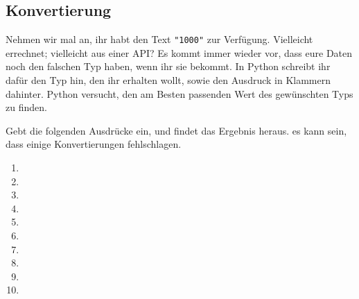 \subsection{Konvertierung}

Nehmen wir mal an, ihr habt den Text \texttt{"1000"} zur Verfügung. Vielleicht
errechnet; vielleicht aus einer API? Es kommt immer wieder vor, dass eure Daten
noch den falschen Typ haben, wenn ihr sie bekommt. In Python schreibt ihr dafür
den Typ hin, den ihr erhalten wollt, sowie den Ausdruck in Klammern dahinter.
Python versucht, den am Besten passenden Wert des gewünschten Typs zu finden.

Gebt die folgenden Ausdrücke ein, und findet das Ergebnis heraus. es kann sein,
dass einige Konvertierungen fehlschlagen.

\begin{multicols}{3}
\begin{enumerate}
    \item {}
    \item {}
    \item {}
    \item {}
    \item {}
    \item {}
    \item {}
    \item {}
    \item {}
    \item {}
\end{enumerate}
\end{multicols}
